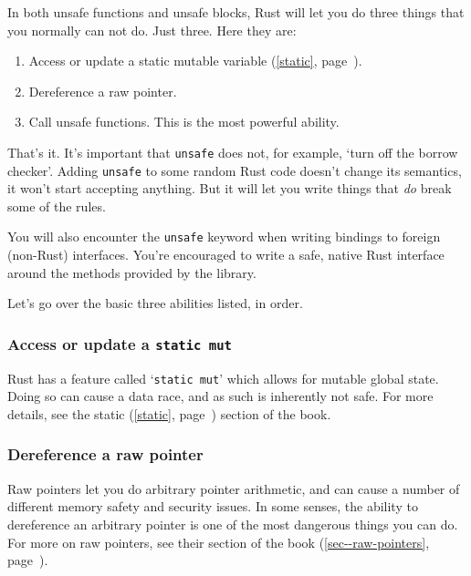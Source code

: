\documentclass[a4paper,]{book}
\renewcommand*{\hyperref}[2][\ar]{%
  \def\ar{#2}%
  #2 (\autoref{#1}, page~\pageref{#1})}
\begin{document}
In both unsafe functions and unsafe blocks, Rust will let you do three
things that you normally can not do. Just three. Here they are:

\begin{enumerate}
\def\labelenumi{\arabic{enumi}.}
\itemsep1pt\parskip0pt
\item
  Access or update a \hyperref[static]{static mutable variable}.
\item
  Dereference a raw pointer.
\item
  Call unsafe functions. This is the most powerful ability.
\end{enumerate}

That's it. It's important that \texttt{unsafe} does not, for example,
`turn off the borrow checker'. Adding \texttt{unsafe} to some random
Rust code doesn't change its semantics, it won't start accepting
anything. But it will let you write things that \emph{do} break some of
the rules.

You will also encounter the \texttt{unsafe} keyword when writing
bindings to foreign (non-Rust) interfaces. You're encouraged to write a
safe, native Rust interface around the methods provided by the library.

Let's go over the basic three abilities listed, in order.

\subsubsection{\texorpdfstring{Access or update a
\texttt{static\ mut}}{Access or update a static mut}}\label{access-or-update-a-static-mut}

Rust has a feature called `\texttt{static\ mut}' which allows for
mutable global state. Doing so can cause a data race, and as such is
inherently not safe. For more details, see the \hyperref[static]{static}
section of the book.

\subsubsection{Dereference a raw
pointer}\label{dereference-a-raw-pointer}

Raw pointers let you do arbitrary pointer arithmetic, and can cause a
number of different memory safety and security issues. In some senses,
the ability to dereference an arbitrary pointer is one of the most
dangerous things you can do. For more on raw pointers, see
\hyperref[sec--raw-pointers]{their section of the book}.
\end{document}
